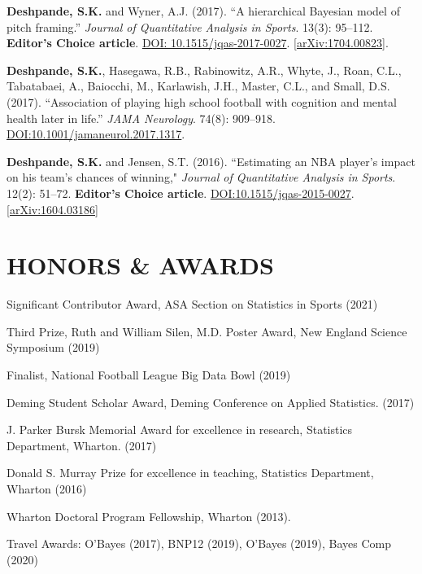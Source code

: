 \documentclass[margin]{res}
\begin{document}
\begin{resume}
\textbf{Deshpande, S.K.} and Wyner, A.J. (2017). ``A hierarchical Bayesian model of pitch framing.'' \textit{Journal of Quantitative Analysis in Sports}. 13(3): 95--112. \textbf{Editor's Choice article}.   \href{https://doi.org/10.1515/jqas-2017-0027}{DOI: 10.1515/jqas-2017-0027}. \href{https://arxiv.org/abs/1704.00823}{[arXiv:1704.00823]}.

\textbf{Deshpande, S.K.}, Hasegawa, R.B., Rabinowitz, A.R., Whyte, J., Roan, C.L., Tabatabaei, A., Baiocchi, M., Karlawish, J.H., Master, C.L., and Small, D.S. (2017). ``Association of playing high school football with cognition and mental health later in life.'' \textit{JAMA Neurology}. 74(8): 909--918. \href{https://doi.org/10.1001/jamaneurol.2017.1317}{DOI:10.1001/jamaneurol.2017.1317}.

\textbf{Deshpande, S.K.} and Jensen, S.T. (2016). ``Estimating an NBA player's impact on his team's chances of winning," \textit{Journal of Quantitative Analysis in Sports}. 12(2): 51--72. \textbf{Editor's Choice article}.  \href{https://doi.org/10.1515/jqas-2015-0027}{DOI:10.1515/jqas-2015-0027}.\href{https://arxiv.org/abs/1604.03186}{[arXiv:1604.03186]}


\section{HONORS \& AWARDS} 

Significant Contributor Award, ASA Section on Statistics in Sports (2021)

Third Prize, Ruth and William Silen, M.D. Poster Award, New England Science Symposium (2019)

Finalist, National Football League Big Data Bowl (2019)

Deming Student Scholar Award, Deming Conference on Applied Statistics. (2017)

J. Parker Bursk Memorial Award for excellence in research, Statistics Department, Wharton. (2017)

Donald S. Murray Prize for excellence in teaching, Statistics Department, Wharton (2016)

Wharton Doctoral Program Fellowship, Wharton (2013).

Travel Awards: O'Bayes (2017), BNP12 (2019), O'Bayes (2019), Bayes Comp (2020)


\end{resume}
\end{document}
